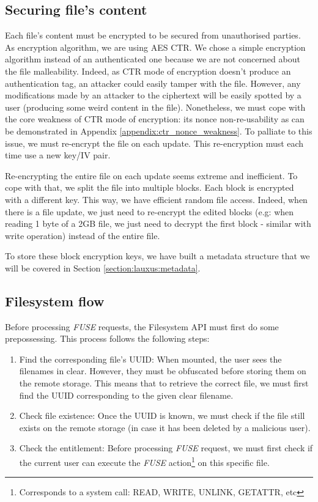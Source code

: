 \documentclass[../main.tex]{subfiles}
\begin{document}
\subsection{Securing file's content}
\label{section:lauxus:filesystem_encryption}

\par Each file's content must be encrypted to be secured from unauthorised parties. As encryption algorithm, we are using AES CTR. We chose a simple encryption algorithm instead of an authenticated one because we are not concerned about the file malleability. Indeed, as CTR mode of encryption doesn't produce an authentication tag, an attacker could easily tamper with the file. However, any modifications made by an attacker to the ciphertext will be easily spotted by a user (producing some weird content in the file). Nonetheless, we must cope with the core weakness of CTR mode of encryption: its nonce non-re-usability as can be demonstrated in Appendix \ref{appendix:ctr_nonce_weakness}. To palliate to this issue, we must re-encrypt the file on each update. This re-encryption must each time use a new key/IV pair.
\par Re-encrypting the entire file on each update seems extreme and inefficient. To cope with that, we split the file into multiple blocks. Each block is encrypted with a different key. This way, we have efficient random file access. Indeed, when there is a file update, we just need to re-encrypt the edited blocks (e.g: when reading 1 byte of a 2GB file, we just need to decrypt the first block - similar with write operation) instead of the entire file.
\par To store these block encryption keys, we have built a metadata structure that we will be covered in Section \ref{section:lauxus:metadata}.


\subsection{Filesystem flow}
\label{section:lauxus:filesystem_flow}

\par Before processing \textit{FUSE} requests, the Filesystem API must first do some prepossessing. This process follows the following steps:
\begin{enumerate}
    \item Find the corresponding file's UUID: When mounted, the user sees the filenames in clear. However, they must be obfuscated before storing them on the remote storage. This means that to retrieve the correct file, we must first find the UUID corresponding to the given clear filename.
    \item Check file existence: Once the UUID is known, we must check if the file still exists on the remote storage (in case it has been deleted by a malicious user).
    \item Check the entitlement: Before processing \textit{FUSE} request, we must first check if the current user can execute the \textit{FUSE} action\footnote{Corresponds to a system call: READ, WRITE, UNLINK, GETATTR, etc} on this specific file.
\end{enumerate}
\end{document}
